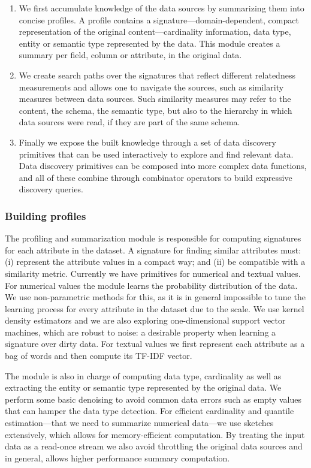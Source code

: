 \begin{enumerate}
\item We first accumulate knowledge of the data sources by summarizing them
into concise profiles. A profile contains a signature---domain-dependent,
compact representation of the original content---cardinality information, data
type, entity or semantic type represented by the data. This module creates a
summary per field, \ie column or attribute, in the original data.
\item We create search paths over the signatures that reflect different relatedness
measurements and allows one to navigate the sources, such as similarity measures
between data sources. Such similarity measures may refer to the content, the
schema, the semantic type, but also to the hierarchy in which data sources were
read, \ie if they are part of the same schema.
\item Finally we expose the built knowledge through a set of data discovery
primitives that can be used interactively to explore and find relevant data.
Data discovery primitives can be composed into more complex data functions, and
all of these combine through combinator operators to build expressive discovery
queries.
\end{enumerate}

\subsubsection{Building profiles}

The profiling and summarization module is responsible
for computing signatures for each attribute in the dataset. A signature for
finding similar attributes must: (i) represent the attribute values in a compact
way; and (ii) be compatible with a similarity metric. Currently we have
primitives for numerical and textual values. For numerical values the module
learns the probability distribution of the data. We use non-parametric methods
for this, as it is in general impossible to tune the learning process for every
attribute in the dataset due to the scale. We use kernel density estimators and
we are also exploring one-dimensional support vector machines, which are robust
to noise: a desirable property when learning a signature over dirty data. For
textual values we first represent each attribute as a bag of words and then
compute its TF-IDF vector.

The module is also in charge of computing data type, cardinality as well as
extracting the entity or semantic type represented by the original data. We
perform some basic denoising to avoid common data errors such as empty values
that can hamper the data type detection. For efficient cardinality and quantile
estimation---that we need to summarize numerical data---we use sketches
extensively, which allows for memory-efficient computation. By treating the
input data as a read-once stream we also avoid throttling the original data
sources and in general, allows higher performance summary computation.

